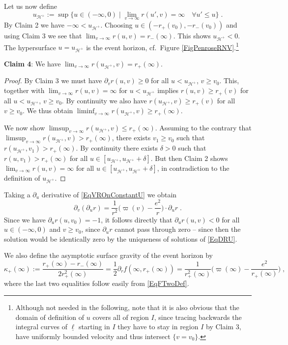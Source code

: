 \documentclass[reqno]{article}
\newcommand{\uh}{u_{\mathcal{H}^+}}
\newcommand{\rd}{\partial}
\begin{document}
Let us now define $$\uh := \sup \{ u \in (-\infty, 0) \; | \; \lim_{v \to \infty} r(u', v) = \infty \quad \forall u' \leq u\}\;.$$
By Claim 2 we have $-\infty < \uh$. Choosing $u \in (-r_+(v_0), -r_-(v_0)) $ and using Claim 3 we see that $\lim_{v \to \infty} r(u,v) = r_-(\infty)$. This shows $\uh < 0$. The hypersurface $u = \uh$ is the event horizon, cf.\ Figure \ref{FigPenroseRNV}.\footnote{Although not needed in the following, note that it is also obvious that the domain of definition of $u$ covers all of region $I$, since tracing backwards the integral curves of $\underline{\ell}$ starting in $I$ they have to stay in region $I$ by Claim 3, have uniformly bounded velocity and thus intersect $\{v = v_0\}$.}

\textbf{Claim 4}: We have $\lim_{v \to \infty} r(\uh, v) = r_+(\infty)$.
\begin{proof}
By Claim 3 we must have $\rd_v r (u,v) \geq 0$ for all $u < \uh$, $v \geq v_0$. This, together with $\lim_{v \to \infty} r(u,v) = \infty$ for $u < \uh$ implies $r(u,v) \geq r_+(v)$ for all $u < \uh$, $v \geq v_0$. By continuity we also have $r(\uh,v) \geq r_+(v)$ for all $v \geq v_0$. We thus obtain $\liminf_{v \to \infty} r(\uh, v) \geq r_+(\infty)$.

We now show $\limsup_{v \to \infty} r(\uh, v) \leq r_+(\infty)$. Assuming to the contrary that $\limsup_{v \to \infty} r(\uh, v) > r_+(\infty)$, there exists $v_1 \geq v_0$ such that $r(\uh, v_1) > r_+(\infty)$. By continuity there exists $\delta >0$ such that $r(u,v_1) > r_+(\infty)$ for all $u \in [\uh, \uh + \delta]$. But then Claim 2 shows $\lim_{v \to \infty} r(u,v) = \infty$ for all $u \in [\uh, \uh + \delta]$, in contradiction to the definition of $\uh$.
\end{proof}

Taking a $\rd_u$ derivative of \eqref{EqVROnConstantU} we obtain 
\begin{equation}
\label{EqDRU}
\rd_v (\rd_u r) = \frac{1}{r^2} \big( \varpi(v) - \frac{e^2}{r}\big)\cdot \rd_u r \;.
\end{equation}
Since we have $\rd_ur (u, v_0) = -1$, it follows directly that $\rd_u r (u,v) <0$ for all $u \in (-\infty, 0)$ and $v \geq v_0$, since $ \rd_ur$ cannot pass through zero -- since then the solution would be identically zero by the uniqueness of solutions of \eqref{EqDRU}.

We also define the asymptotic surface gravity of the event horizon by 
\begin{equation}
\label{EqDefSGE}
\kappa_+(\infty) := \frac{r_+(\infty) - r_-(\infty)}{2 r_+^2(\infty)} = \frac{1}{2}\rd_r f(\infty, r_+(\infty)) = \frac{1}{r_+^2(\infty)} \big(\varpi(\infty) - \frac{e^2}{r_+(\infty)}\big) \;,
\end{equation}
where the last two equalities follow easily from \eqref{EqFTwoDef}.
\end{document}
